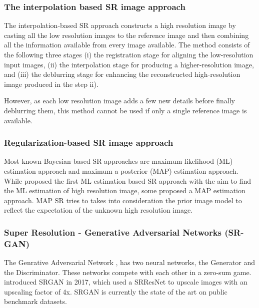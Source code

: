 \documentclass[oneside,a4paper,12pt]{report}
\begin{document}
		\subsubsection{The interpolation based SR image approach}
			\hspace*{0.25 in} The interpolation-based SR approach constructs a high resolution image by casting all the low resolution images to the reference image and then combining all the information available from every image available.
			The method consists of the following three stages
			(i) the registration stage for aligning the low-resolution input images,
	    (ii) the interpolation stage for producing a higher-resolution image, and
			(iii) the deblurring stage for enhancing the
       reconstructed high-resolution image produced in the step ii).


			However, as each low resolution image adds a few new details before finally deblurring them, this method cannot be used if only a single reference image is available.

		\subsubsection{Regularization-based SR image approach}
		  \hspace*{0.25 in} Most known Bayesian-based SR approaches are
maximum likelihood (ML) estimation approach  and maximum a posterior (MAP) estimation approach.\\
    \hspace*{0.25 in}  While \cite{Brian1996ML} proposed the first ML estimation based SR approach with the aim to find the ML estimation of high resolution image, some proposed a MAP estimation approach. MAP SR tries to takes into consideration the prior image model to reflect the expectation of the unknown high resolution image.

			\subsubsection{Super Resolution - Generative Adversarial Networks (SR-GAN)}

			\hspace*{0.25 in} The Genrative Adversarial Network \cite{goodfellow2014generative}, has two neural networks, the Generator and the Discriminator. These networks compete with each other in a zero-sum game.
      \cite{ledig2017photorealistic} introduced SRGAN in 2017, which used a SRResNet to upscale images with an upscaling factor of 4x. SRGAN is currently the state of the art on public benchmark datasets.
\end{document}
